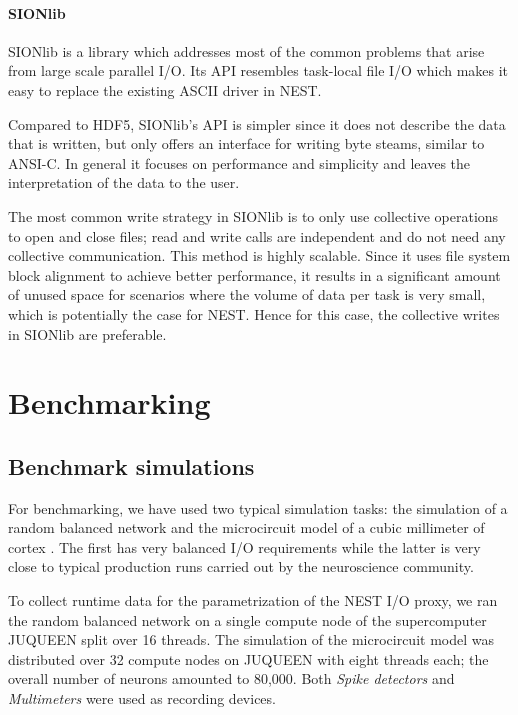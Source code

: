 \documentclass[]{YIC2015}
\begin{document}

\paragraph{SIONlib}

SIONlib \cite{frings2009scalable} is a library which addresses most of
the common problems that arise from large scale parallel I/O. Its API
resembles task-local file I/O which makes it easy to replace the
existing ASCII driver in NEST.

Compared to HDF5, SIONlib's API is simpler since it does not describe
the data that is written, but only offers an interface for writing
byte steams, similar to ANSI-C. In general it focuses on performance
and simplicity and leaves the interpretation of the data to the user.

The most common write strategy in SIONlib is to only use collective
operations to open and close files; read and write calls are
independent and do not need any collective communication. This method
is highly scalable. Since it uses file system block alignment to
achieve better performance, it results in a significant amount of
unused space for scenarios where the volume of data per task is very
small, which is potentially the case for NEST. Hence for this case,
the collective writes in SIONlib are preferable.

\section{Benchmarking}

\subsection{Benchmark simulations}\label{sect:use_cases}

For benchmarking, we have used two typical simulation tasks: the
simulation of a random balanced network \cite{morrison07} and the
microcircuit model of a cubic millimeter of cortex \cite{potjans14}.
The first has very balanced I/O requirements while the latter is very
close to typical production runs carried out by the neuroscience
community.

To collect runtime data for the parametrization of the NEST I/O proxy,
we ran the random balanced network on a single compute node of the
supercomputer JUQUEEN split over 16 threads.  The simulation of the
microcircuit model was distributed over 32 compute nodes on JUQUEEN
with eight threads each; the overall number of neurons amounted to
80,000. Both \emph{Spike detectors} and \emph{Multimeters} were used
as recording devices.
\end{document}

